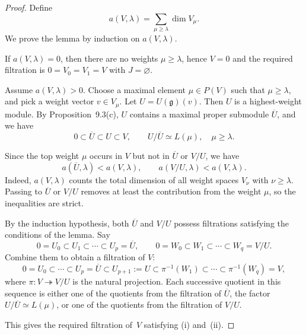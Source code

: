 \documentclass[12pt]{article}
\begin{document}
\begin{proof}
Define
\[
a(V,\lambda) = \sum_{\mu \ge \lambda} \dim V_\mu.
\]
We prove the lemma by induction on $a(V,\lambda)$.

If $a(V,\lambda)=0$, then there are no weights $\mu \ge \lambda$, hence
$V=0$ and the required filtration is $0 = V_0 = V_1 = V$ with $J = \varnothing$.

Assume $a(V,\lambda) > 0$. Choose a maximal element $\mu \in P(V)$ such that $\mu \ge \lambda$,
and pick a weight vector $v \in V_\mu$. Let $U = U(\mathfrak{g})(v)$.
Then $U$ is a highest-weight module. By Proposition~9.3(c),
$U$ contains a maximal proper submodule $\overline{U}$, and we have
\[
0 \subset \overline{U} \subset U \subset V, \qquad
U/\overline{U} \simeq L(\mu), \quad \mu \ge \lambda.
\]

Since the top weight $\mu$ occurs in $V$ but not in $\overline{U}$ or $V/U$,
we have
\[
a(\overline{U},\lambda) < a(V,\lambda), \qquad
a(V/U,\lambda) < a(V,\lambda).
\]
Indeed, $a(V,\lambda)$ counts the total dimension of all weight spaces
$V_\nu$ with $\nu \ge \lambda$.
Passing to $\overline{U}$ or $V/U$ removes at least the contribution
from the weight $\mu$, so the inequalities are strict.

By the induction hypothesis, both $\overline{U}$ and $V/U$
possess filtrations satisfying the conditions of the lemma.
Say
\[
0 = U_0 \subset U_1 \subset \cdots \subset U_p = \overline{U},
\qquad
0 = W_0 \subset W_1 \subset \cdots \subset W_q = V/U.
\]
Combine them to obtain a filtration of $V$:
\[
0 = U_0 \subset \cdots \subset U_p = \overline{U}
  \subset U_{p+1} := U
  \subset \pi^{-1}(W_1) \subset \cdots \subset \pi^{-1}(W_q) = V,
\]
where $\pi: V \twoheadrightarrow V/U$ is the natural projection.
Each successive quotient in this sequence is either one of the
quotients from the filtration of $\overline{U}$, the factor
$U/\overline{U} \simeq L(\mu)$, or one of the quotients from the
filtration of $V/U$.

This gives the required filtration of~$V$ satisfying (i) and~(ii).
\end{proof}
\end{document}
